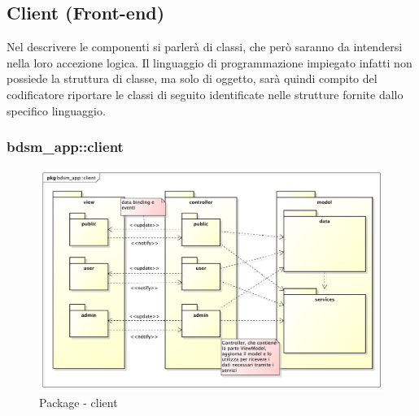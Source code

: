 %


\subsection{Client (Front-end)} %
\label{sub:client}
Nel descrivere le componenti si parlerà di classi, che però saranno da intendersi nella loro accezione logica. Il linguaggio di programmazione impiegato infatti non possiede la struttura di classe, ma solo di oggetto, sarà quindi compito del codificatore riportare le classi di seguito identificate nelle strutture fornite dallo specifico linguaggio.

	\subsubsection{bdsm\_app::client} %
	\label{ssub:bdsm_app_client}
	\begin{figure}[htbp]
		\centering
		\centerline{\includegraphics[scale=0.45]{./images/client.pdf}}
		\caption{Package - client}
	\end{figure}
	
